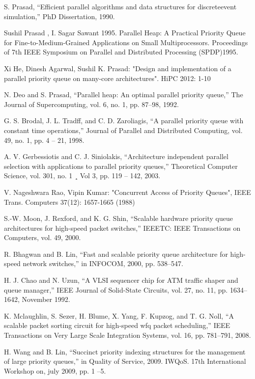 \documentclass[10pt, conference, compsocconf]{IEEEtran}
\begin{document}
\begin{thebibliography}{1}

S. Prasad, “Efficient parallel algorithms and data structures for discreteevent
simulation,” PhD Dissertation, 1990.

 Sushil Prasad , I. Sagar Sawant 1995. Parallel Heap: A Practical Priority Queue for Fine-to-Medium-Grained Applications on Small Multiprocessors. Proceedings of 7th IEEE Symposium on Parallel and Distributed Processing (SPDP)1995.

	Xi He, Dinesh Agarwal, Sushil K. Prasad: "Design and implementation of a parallel priority queue on many-core architectures". HiPC 2012: 1-10

 N. Deo and S. Prasad, “Parallel heap: An optimal parallel priority queue,” The Journal of Supercomputing, vol. 6, no. 1, pp. 87–98, 1992.

 G. S. Brodal, J. L. Tradff, and C. D. Zaroliagis, “A parallel priority queue with constant time operations,” Journal of
Parallel and Distributed Computing, vol. 49, no. 1, pp. 4 – 21, 1998.

 A. V. Gerbessiotis and C. J. Siniolakis, “Architecture independent parallel selection with applications to parallel
priority queues,” Theoretical Computer Science, vol. 301, no. 1 ¸ Vol 3, pp. 119 – 142, 2003.

	V. Nageshwara Rao, Vipin Kumar: "Concurrent Access of Priority Queues", IEEE Trans. Computers 37(12): 1657-1665 (1988)


 S.-W. Moon, J. Rexford, and K. G. Shin, “Scalable hardware priority queue architectures for high-speed
packet switches,” IEEETC: IEEE Transactions on Computers, vol. 49, 2000.

 R. Bhagwan and B. Lin, “Fast and scalable priority queue architecture for high-speed network switches,”
in INFOCOM, 2000, pp. 538–547.

 H. J. Chao and N. Uzun, “A VLSI sequencer chip for ATM traffic shaper and queue manager,” IEEE
Journal of Solid-State Circuits, vol. 27, no. 11, pp. 1634–1642, November 1992.

 K. Mclaughlin, S. Sezer, H. Blume, X. Yang, F. Kupzog, and T. G. Noll, “A scalable packet sorting circuit for high-speed
wfq packet scheduling,” IEEE Transactions on Very Large Scale Integration Systems, vol. 16, pp. 781–791, 2008.

 H. Wang and B. Lin, “Succinct priority indexing structures for the management of large priority queues,” in Quality of
Service, 2009. IWQoS. 17th International Workshop on, july 2009, pp. 1 –5.


\end{thebibliography}
\end{document}
